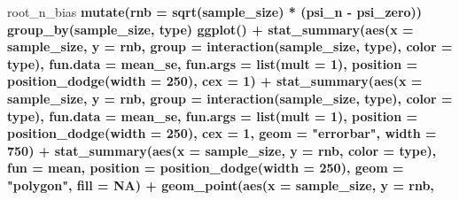 \documentclass[11pt,openright,twoside]{book}
\newenvironment{Shaded}{\begin{snugshade}}{\end{snugshade}}
\newcommand{\DataTypeTok}[1]{\textcolor[rgb]{0.13,0.29,0.53}{#1}}
\newcommand{\DecValTok}[1]{\textcolor[rgb]{0.00,0.00,0.81}{#1}}
\newcommand{\KeywordTok}[1]{\textcolor[rgb]{0.13,0.29,0.53}{\textbf{#1}}}
\newcommand{\NormalTok}[1]{#1}
\newcommand{\OperatorTok}[1]{\textcolor[rgb]{0.81,0.36,0.00}{\textbf{#1}}}
\newcommand{\OtherTok}[1]{\textcolor[rgb]{0.56,0.35,0.01}{#1}}
\newcommand{\StringTok}[1]{\textcolor[rgb]{0.31,0.60,0.02}{#1}}
\theoremstyle{definition}
\theoremstyle{definition}
\theoremstyle{definition}
\theoremstyle{remark}
\begin{document}
\begin{Shaded}
\begin{Highlighting}[]
{{{{{{{{{{{{{\NormalTok{root_n_bias }\OperatorTok{%
\StringTok{  }\KeywordTok{mutate}\NormalTok{(}\DataTypeTok{rnb =} \KeywordTok{sqrt}\NormalTok{(sample_size) }\OperatorTok{*}\StringTok{ }\NormalTok{(psi_n }\OperatorTok{-}\StringTok{ }\NormalTok{psi_zero)) }\OperatorTok{%
\StringTok{  }\KeywordTok{group_by}\NormalTok{(sample_size, type) }\OperatorTok{%
\StringTok{  }\KeywordTok{ggplot}\NormalTok{() }\OperatorTok{+}
\StringTok{  }\KeywordTok{stat_summary}\NormalTok{(}\KeywordTok{aes}\NormalTok{(}\DataTypeTok{x =}\NormalTok{ sample_size, }\DataTypeTok{y =}\NormalTok{ rnb,}
                   \DataTypeTok{group =} \KeywordTok{interaction}\NormalTok{(sample_size, type),}
                   \DataTypeTok{color =}\NormalTok{ type),}
               \DataTypeTok{fun.data =}\NormalTok{ mean_se, }\DataTypeTok{fun.args =} \KeywordTok{list}\NormalTok{(}\DataTypeTok{mult =} \DecValTok{1}\NormalTok{),}
               \DataTypeTok{position =} \KeywordTok{position_dodge}\NormalTok{(}\DataTypeTok{width =} \DecValTok{250}\NormalTok{), }\DataTypeTok{cex =} \DecValTok{1}\NormalTok{) }\OperatorTok{+}
\StringTok{  }\KeywordTok{stat_summary}\NormalTok{(}\KeywordTok{aes}\NormalTok{(}\DataTypeTok{x =}\NormalTok{ sample_size, }\DataTypeTok{y =}\NormalTok{ rnb,}
                   \DataTypeTok{group =} \KeywordTok{interaction}\NormalTok{(sample_size, type),}
                   \DataTypeTok{color =}\NormalTok{ type),}
               \DataTypeTok{fun.data =}\NormalTok{ mean_se, }\DataTypeTok{fun.args =} \KeywordTok{list}\NormalTok{(}\DataTypeTok{mult =} \DecValTok{1}\NormalTok{),}
               \DataTypeTok{position =} \KeywordTok{position_dodge}\NormalTok{(}\DataTypeTok{width =} \DecValTok{250}\NormalTok{), }\DataTypeTok{cex =} \DecValTok{1}\NormalTok{,}
               \DataTypeTok{geom =} \StringTok{"errorbar"}\NormalTok{, }\DataTypeTok{width =} \DecValTok{750}\NormalTok{) }\OperatorTok{+}
\StringTok{  }\KeywordTok{stat_summary}\NormalTok{(}\KeywordTok{aes}\NormalTok{(}\DataTypeTok{x =}\NormalTok{ sample_size, }\DataTypeTok{y =}\NormalTok{ rnb,}
                   \DataTypeTok{color =}\NormalTok{ type),}
               \DataTypeTok{fun =}\NormalTok{ mean,}
               \DataTypeTok{position =} \KeywordTok{position_dodge}\NormalTok{(}\DataTypeTok{width =} \DecValTok{250}\NormalTok{),}
               \DataTypeTok{geom =} \StringTok{"polygon"}\NormalTok{, }\DataTypeTok{fill =} \OtherTok{NA}\NormalTok{) }\OperatorTok{+}
\StringTok{  }\KeywordTok{geom_point}\NormalTok{(}\KeywordTok{aes}\NormalTok{(}\DataTypeTok{x =}\NormalTok{ sample_size, }\DataTypeTok{y =}\NormalTok{ rnb,}
}}}}}}}}}}}}}}}}
\end{Highlighting}
\end{Shaded}
\end{document}
